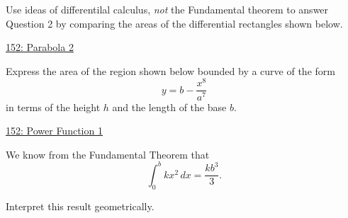 \documentclass{ximera}
\begin{document}
\begin{question}  \label{Q9erkmbzxee}
Use ideas of differentilal calculus, \emph{not} the Fundamental theorem to answer Question 2 by comparing the areas of the differential rectangles shown below.

\begin{onlineOnly}
    \begin{center}
\end{center}
\end{onlineOnly}

\href{https://www.desmos.com/calculator/pvskgbpnew}{152: Parabola 2}

\end{question}



\begin{question} \label{QOLDefeefKRerbttp}
Express the area of the region shown below bounded by a curve of the form 
\[
   y=b - \frac{x^8}{a^7}
\]
in terms of the height $h$ and the length of the base $b$.

\begin{onlineOnly}
    \begin{center}
\end{center}
\end{onlineOnly}

\href{https://www.desmos.com/calculator/0mftg33xde}{152: Power Function 1}

\end{question}




We know from the Fundamental Theorem that
\[
   \int_0^b kx^2\, dx = \frac{kb^3}{3}. 
\]

\begin{question} \label{QOidfsfer}
Interpret this result geometrically.
\end{question}
\end{document}
